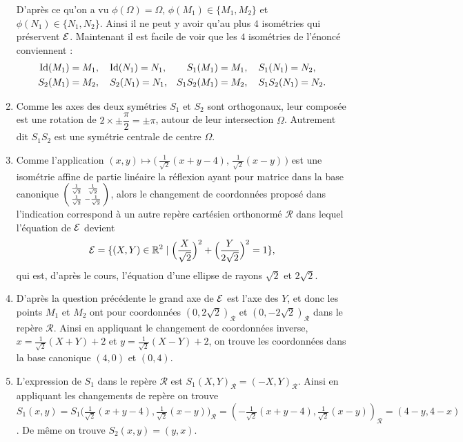 \documentclass[a4paper,12pt,reqno]{amsart}
\begin{document}
\begin{solution}
\begin{enumerate}
    D'après ce qu'on a vu $\phi(\Omega) = \Omega$, $\phi(M_{1}) \in \{M_{1},M_{2}\}$ et $\phi(N_{1}) \in \{N_{1},N_{2}\}$. Ainsi il ne peut y avoir qu'au plus $4$ isométries qui préservent $\mathcal{E}$. Maintenant il est facile de voir que les $4$ isométries de l'énoncé conviennent :
    \begin{align*}
      \mathrm{Id}(M_{1})=M_{1}&,\quad \mathrm{Id}(N_{1})=N_{1}, &
      S_{1}(M_{1})=M_{1}&,\quad S_{1}(N_{1})=N_{2}, \\
      S_{2}(M_{1})=M_{2}&,\quad S_{2}(N_{1})=N_{1}, &
      S_{1}S_{2}(M_{1})=M_{2}&,\quad S_{1}S_{2}(N_{1})=N_{2}.
    \end{align*}
    \item Comme les axes des deux symétries $S_{1}$ et $S_{2}$ sont orthogonaux, leur composée est une rotation de $2\times \pm \dfrac{\pi}{2} = \pm \pi$, autour de leur intersection $\Omega$. Autrement dit $S_{1}S_{2}$ est une symétrie centrale de centre $\Omega$.
    \item Comme l'application $(x,y) \mapsto \big(\,\frac{1}{\sqrt{2}}(x+y-4),\,\frac{1}{\sqrt{2}}(x-y)\,\big)$ est une isométrie affine de partie linéaire la réflexion ayant pour matrice dans la base canonique
    $
      \begin{psmallmatrix}
        \frac{1}{\sqrt{2}} & \frac{1}{\sqrt{2}} \\
        \frac{1}{\sqrt{2}} & -\frac{1}{\sqrt{2}} \\
      \end{psmallmatrix}
    $, alors le changement de coordonnées proposé dans l'indication correspond à un autre repère cartésien orthonormé $\mathcal{R}$ dans lequel l'équation de $\mathcal{E}$ devient
    \[
      \mathcal{E}=\{ (X,Y) \in \mathbb{R}^{2} \mid \Big(\frac{X}{\sqrt{2}}\Big)^{2}+\Big(\frac{Y}{2\sqrt{2}}\Big)^{2}=1\},
    \]
    qui est, d'après le cours, l'équation d'une ellipse de rayons $\sqrt{2}$ et $2\sqrt{2}$.
    \item D'après la question précédente le grand axe de $\mathcal{E}$ est l'axe des $Y$, et donc les points $M_{1}$ et $M_{2}$ ont pour coordonnées $(0,2\sqrt{2})_{\mathcal{R}}$ et $(0,-2\sqrt{2})_{\mathcal{R}}$ dans le repère $\mathcal{R}$. Ainsi en appliquant le changement de coordonnées inverse, $x=\frac{1}{\sqrt{2}}(X+Y)+2$ et $y=\frac{1}{\sqrt{2}}(X-Y)+2$, on trouve les coordonnées dans la base canonique $(4,0)$ et $(0,4)$.
    \item L'expression de $S_{1}$ dans le repère $\mathcal{R}$ est $S_{1}(X,Y)_{\mathcal{R}}=(-X,Y)_{\mathcal{R}}$. Ainsi en appliquant les changements de repère on trouve $S_{1}(x,y) = S_{1}\big(\frac{1}{\sqrt{2}}(x+y-4), \frac{1}{\sqrt{2}}(x-y)\big)_{\mathcal{R}} = (-\frac{1}{\sqrt{2}}(x+y-4), \frac{1}{\sqrt{2}}(x-y))_{\mathcal{R}} = (4-y, 4-x)$. De même on trouve $S_{2}(x,y)=(y,x)$.
  \end{enumerate}
\end{solution}
\end{document}
